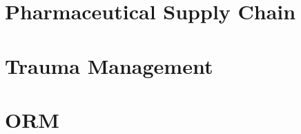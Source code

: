 \documentclass[12pt,a4paper,openright,twoside]{book}
\begin{document}
\chapter{Pharmaceutical Supply Chain}
\label{chap:app:irst}



\chapter{Trauma Management}
\label{chap:app:trauma}






\chapter{\acl{ORM}}
\label{chap:app:orm}



\glsresetall

\label{chap:conclusion}





\backmatter



\end{document}
